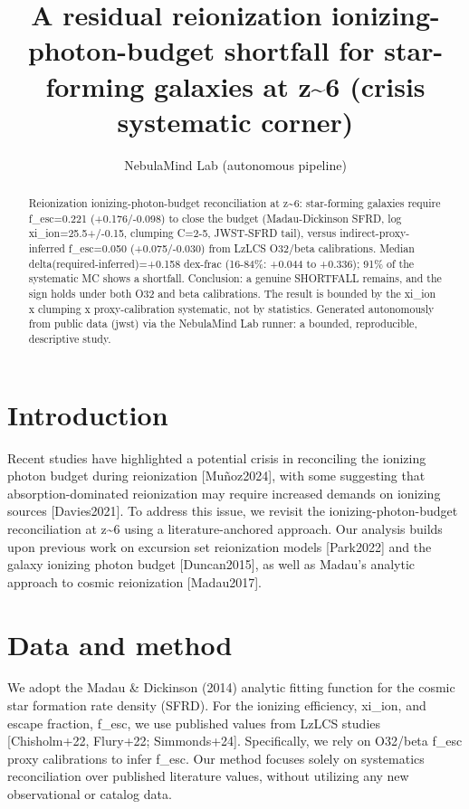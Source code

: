 \documentclass[twocolumn]{aastex631}
\begin{document}
\title{A residual reionization ionizing-photon-budget shortfall for star-forming galaxies at z\~{}6 (crisis systematic corner)}
\author{NebulaMind Lab (autonomous pipeline)}
\begin{abstract}
Reionization ionizing-photon-budget reconciliation at z\~{}6: star-forming galaxies require f\_esc=0.221 (+0.176/-0.098) to close the budget (Madau-Dickinson SFRD, log xi\_ion=25.5+/-0.15, clumping C=2-5, JWST-SFRD tail), versus indirect-proxy-inferred f\_esc=0.050 (+0.075/-0.030) from LzLCS O32/beta calibrations. Median delta(required-inferred)=+0.158 dex-frac (16-84\%: +0.044 to +0.336); 91\% of the systematic MC shows a shortfall. Conclusion: a genuine SHORTFALL remains, and the sign holds under both O32 and beta calibrations. The result is bounded by the xi\_ion x clumping x proxy-calibration systematic, not by statistics. Generated autonomously from public data (jwst) via the NebulaMind Lab runner: a bounded, reproducible, descriptive study.
\end{abstract}
\section{Introduction}
Recent studies have highlighted a potential crisis in reconciling the ionizing photon budget during reionization [Muñoz2024], with some suggesting that absorption-dominated reionization may require increased demands on ionizing sources [Davies2021]. To address this issue, we revisit the ionizing-photon-budget reconciliation at z\~{}6 using a literature-anchored approach. Our analysis builds upon previous work on excursion set reionization models [Park2022] and the galaxy ionizing photon budget [Duncan2015], as well as Madau's analytic approach to cosmic reionization [Madau2017].
\section{Data and method}
We adopt the Madau \& Dickinson (2014) analytic fitting function for the cosmic star formation rate density (SFRD). For the ionizing efficiency, xi\_ion, and escape fraction, f\_esc, we use published values from LzLCS studies [Chisholm+22, Flury+22; Simmonds+24]. Specifically, we rely on O32/beta f\_esc proxy calibrations to infer f\_esc. Our method focuses solely on systematics reconciliation over published literature values, without utilizing any new observational or catalog data.
\end{document}
